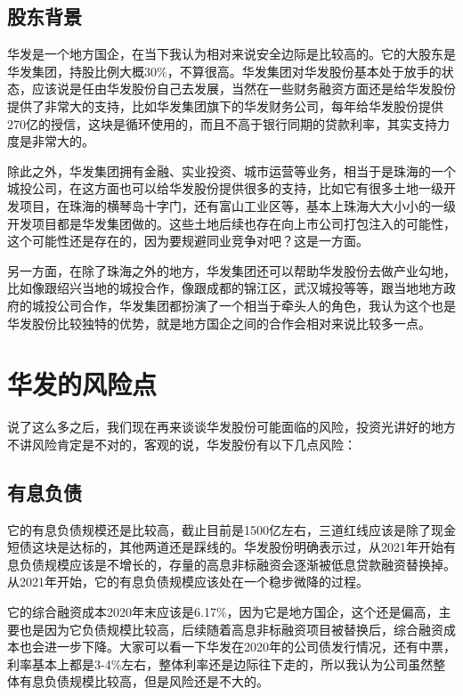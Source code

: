 \documentclass[a4paper,12pt,lang=cn,fontset = windows]{elegantpaper} %
\begin{document}
\subsection{股东背景}

华发是一个地方国企，在当下我认为相对来说安全边际是比较高的。它的大股东是华发集团，持股比例大概30\%，不算很高。华发集团对华发股份基本处于放手的状态，应该说是任由华发股份自己去发展，当然在一些财务融资方面还是给华发股份提供了非常大的支持，比如华发集团旗下的华发财务公司，每年给华发股份提供270亿的授信，这块是循环使用的，而且不高于银行同期的贷款利率，其实支持力度是非常大的。

除此之外，华发集团拥有金融、实业投资、城市运营等业务，相当于是珠海的一个城投公司，在这方面也可以给华发股份提供很多的支持，比如它有很多土地一级开发项目，在珠海的横琴岛十字门，还有富山工业区等，基本上珠海大大小小的一级开发项目都是华发集团做的。这些土地后续也存在向上市公司打包注入的可能性，这个可能性还是存在的，因为要规避同业竞争对吧？这是一方面。

另一方面，在除了珠海之外的地方，华发集团还可以帮助华发股份去做产业勾地，比如像跟绍兴当地的城投合作，像跟成都的锦江区，武汉城投等等，跟当地地方政府的城投公司合作，华发集团都扮演了一个相当于牵头人的角色，我认为这个也是华发股份比较独特的优势，就是地方国企之间的合作会相对来说比较多一点。



\section{华发的风险点}

说了这么多之后，我们现在再来谈谈华发股份可能面临的风险，投资光讲好的地方不讲风险肯定是不对的，客观的说，华发股份有以下几点风险：



\subsection{有息负债}

它的有息负债规模还是比较高，截止目前是1500亿左右，三道红线应该是除了现金短债这块是达标的，其他两道还是踩线的。华发股份明确表示过，从2021年开始有息负债规模应该是不增长的，存量的高息非标融资会逐渐被低息贷款融资替换掉。从2021年开始，它的有息负债规模应该处在一个稳步微降的过程。

它的综合融资成本2020年末应该是6.17\%，因为它是地方国企，这个还是偏高，主要也是因为它负债规模比较高，后续随着高息非标融资项目被替换后，综合融资成本也会进一步下降。大家可以看一下华发在2020年的公司债发行情况，还有中票，利率基本上都是3-4\%左右，整体利率还是边际往下走的，所以我认为公司虽然整体有息负债规模比较高，但是风险还是不大的。
\end{document}
